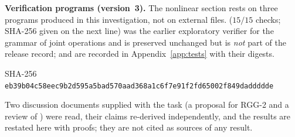 \documentclass[11pt,a4paper]{article}
\theoremstyle{plain}
\theoremstyle{definition}
\begin{document}
\par\smallskip\noindent\textbf{Verification programs (version~3).} The nonlinear section rests on three programs produced in this investigation, not on external files.  ($15/15$ checks; SHA-256 given on the next line) was the earlier exploratory verifier for the grammar of joint operations and is preserved unchanged but is \emph{not} part of the release record;  and  are recorded in Appendix~\ref{app:tests} with their digests.
\begin{center}\footnotesize{}\quad SHA-256 \texttt{\scriptsize eb39b04c58eec9b2d595a5bad570aad368a1c6f7e91f2fd65002f849daddddde}\end{center}
\noindent Two discussion documents supplied with the task (a proposal for RGG-2 and a review of ) were read, their claims re-derived independently, and the results are restated here with proofs; they are not cited as sources of any result.
\end{document}
